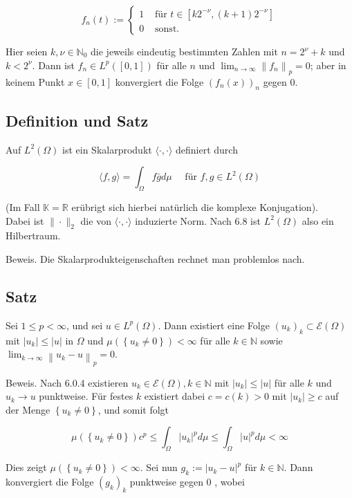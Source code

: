 \documentclass[10pt, letterpaper]{article}
\begin{document}
$$
f_{n}(t):= \begin{cases}1 & \text { für } t \in\left[k 2^{-\nu},(k+1) 2^{-\nu}\right] \\ 0 & \text { sonst. }\end{cases}
$$

Hier seien $k, \nu \in \mathbb{N}_{0}$ die jeweils eindeutig bestimmten Zahlen mit $n=2^{\nu}+k$ und $k<2^{\nu}$. Dann ist $f_{n} \in L^{p}([0,1])$ für alle $n$ und $\lim _{n \rightarrow \infty}\left\|f_{n}\right\|_{p}=0$; aber in keinem Punkt $x \in[0,1]$ konvergiert die Folge $\left(f_{n}(x)\right)_{n}$ gegen 0.

\subsection*{Definition und Satz}
Auf $L^{2}(\Omega)$ ist ein Skalarprodukt $\langle\cdot, \cdot\rangle$ definiert durch

$$
\langle f, g\rangle=\int_{\Omega} f \bar{g} d \mu \quad \text { für } f, g \in L^{2}(\Omega)
$$

(Im Fall $\mathbb{K}=\mathbb{R}$ erübrigt sich hierbei natürlich die komplexe Konjugation).\\
Dabei ist $\|\cdot\|_{2}$ die von $\langle\cdot, \cdot\rangle$ induzierte Norm. Nach 6.8 ist $L^{2}(\Omega)$ also ein Hilbertraum.

Beweis. Die Skalarprodukteigenschaften rechnet man problemlos nach.

\subsection*{Satz}
Sei $1 \leq p<\infty$, und sei $u \in L^{p}(\Omega)$. Dann existiert eine Folge $\left(u_{k}\right)_{k} \subset \mathcal{E}(\Omega)$ mit $\left|u_{k}\right| \leq|u|$ in $\Omega$ und $\mu\left(\left\{u_{k} \neq 0\right\}\right)<\infty$ für alle $k \in \mathbb{N}$ sowie $\lim _{k \rightarrow \infty}\left\|u_{k}-u\right\|_{p}=0$.

Beweis. Nach 6.0.4 existieren $u_{k} \in \mathcal{E}(\Omega), k \in \mathbb{N}$ mit $\left|u_{k}\right| \leq|u|$ für alle $k$ und $u_{k} \rightarrow u$ punktweise. Für festes $k$ existiert dabei $c=c(k)>0$ mit $\left|u_{k}\right| \geq c$ auf der Menge $\left\{u_{k} \neq 0\right\}$, und somit folgt

$$
\mu\left(\left\{u_{k} \neq 0\right\}\right) c^{p} \leq \int_{\Omega}\left|u_{k}\right|^{p} d \mu \leq \int_{\Omega}|u|^{p} d \mu<\infty
$$

Dies zeigt $\mu\left(\left\{u_{k} \neq 0\right\}\right)<\infty$. Sei nun $g_{k}:=\left|u_{k}-u\right|^{p}$ für $k \in \mathbb{N}$. Dann konvergiert die Folge $\left(g_{k}\right)_{k}$ punktweise gegen 0 , wobei
\end{document}
